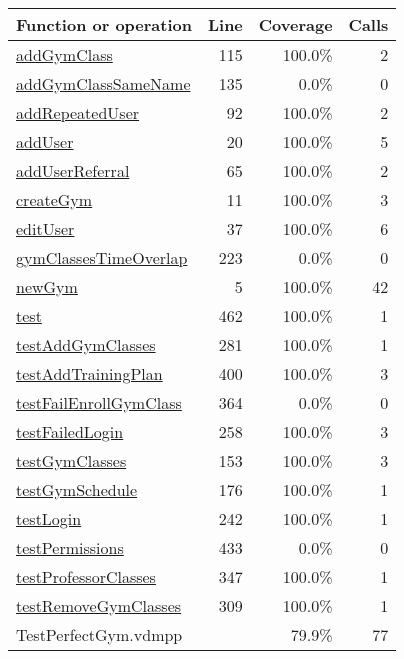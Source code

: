 \begin{longtable}{|l|r|r|r|}
\hline
Function or operation & Line & Coverage & Calls \\
\hline
\hline
\hyperref[addGymClass:115]{addGymClass} & 115&100.0\% & 2 \\
\hline
\hyperref[addGymClassSameName:135]{addGymClassSameName} & 135&0.0\% & 0 \\
\hline
\hyperref[addRepeatedUser:92]{addRepeatedUser} & 92&100.0\% & 2 \\
\hline
\hyperref[addUser:20]{addUser} & 20&100.0\% & 5 \\
\hline
\hyperref[addUserReferral:65]{addUserReferral} & 65&100.0\% & 2 \\
\hline
\hyperref[createGym:11]{createGym} & 11&100.0\% & 3 \\
\hline
\hyperref[editUser:37]{editUser} & 37&100.0\% & 6 \\
\hline
\hyperref[gymClassesTimeOverlap:223]{gymClassesTimeOverlap} & 223&0.0\% & 0 \\
\hline
\hyperref[newGym:5]{newGym} & 5&100.0\% & 42 \\
\hline
\hyperref[test:462]{test} & 462&100.0\% & 1 \\
\hline
\hyperref[testAddGymClasses:281]{testAddGymClasses} & 281&100.0\% & 1 \\
\hline
\hyperref[testAddTrainingPlan:400]{testAddTrainingPlan} & 400&100.0\% & 3 \\
\hline
\hyperref[testFailEnrollGymClass:364]{testFailEnrollGymClass} & 364&0.0\% & 0 \\
\hline
\hyperref[testFailedLogin:258]{testFailedLogin} & 258&100.0\% & 3 \\
\hline
\hyperref[testGymClasses:153]{testGymClasses} & 153&100.0\% & 3 \\
\hline
\hyperref[testGymSchedule:176]{testGymSchedule} & 176&100.0\% & 1 \\
\hline
\hyperref[testLogin:242]{testLogin} & 242&100.0\% & 1 \\
\hline
\hyperref[testPermissions:433]{testPermissions} & 433&0.0\% & 0 \\
\hline
\hyperref[testProfessorClasses:347]{testProfessorClasses} & 347&100.0\% & 1 \\
\hline
\hyperref[testRemoveGymClasses:309]{testRemoveGymClasses} & 309&100.0\% & 1 \\
\hline
\hline
TestPerfectGym.vdmpp & & 79.9\% & 77 \\
\hline
\end{longtable}


